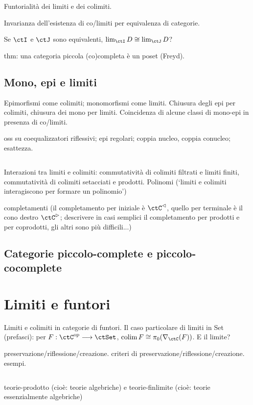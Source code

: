 Funtorialità dei limiti e dei colimiti.

Invarianza dell'esistenza di co/limiti per equivalenza di categorie.

Se \(\ctI\) e \(\ctJ\) sono equivalenti, \(\lim_\ctI D\cong\lim_\ctJ D\)?

thm: una categoria piccola (co)completa è un poset (Freyd).

\subsection{Mono, epi e limiti}
Epimorfismi come colimiti; monomorfismi come limiti. Chiusura degli epi per colimiti, chiusura dei mono per limiti. Coincidenza di alcune classi di mono-epi in presenza di co/limiti.

oss su coequalizzatori riflessivi; epi regolari; coppia nucleo, coppia conucleo; esattezza.

\subsection{}

Interazioni tra limiti e colimiti: commutatività di colimiti filtrati e limiti finiti, commutatività di colimiti setacciati e prodotti. Polinomi (`limiti e colimiti interagiscono per formare un polinomio')

completamenti (il completamento per iniziale è \(\ctC^\lhd\), quello per terminale è il cono destro \(\ctC^\rhd\); descrivere in casi semplici il completamento per prodotti e per coprodotti, gli altri sono più difficili...)

\subsection{Categorie piccolo-complete e piccolo-cocomplete}

\section{Limiti e funtori}
Limiti e colimiti in categorie di funtori. Il caso particolare di limiti in Set (prefasci): per \(F : \ctC^\op\fun\ctSet\), \(\colim F\cong \pi_0(\Elts\ctC F)\). E il limite?

preservazione/riflessione/creazione. criteri di preservazione/riflessione/creazione. esempi.

\subsection{}
teorie-prodotto (cioè: teorie algebriche) e teorie-finlimite (cioè: teorie essenzialmente algebriche)
